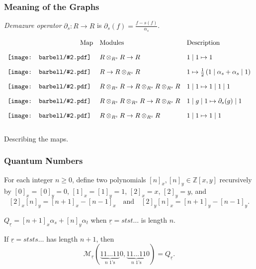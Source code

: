 \documentclass[pdf]{beamer}
\def\ul#1{\underline{#1}}
\def\MM{\mathcal M}
\def\ZZ{\mathbb Z}
\def\half{\frac{1}{2}}
\newcommand{\dobarbell}[2]{
\vcenter{\hbox{%
\texttt{[image: barbell/\#2.pdf]}
}}
}
\newcommand{\barbell}[1]{
\mathchoice%
{\dobarbell{1.6}{#1}}
{\dobarbell{1.2}{#1}}
{\dobarbell{0.9}{#1}}
{\dobarbell{0.9}{#1}}
}
\def\stimes{\otimes_{R^s}}
\begin{document}
\begin{frame}
	\frametitle{Meaning of the Graphs}
	\emph{Demazure operator} $\partial_s: R \to R$ is $\partial_s(f) = \frac{f - s(f)}{\alpha_s}$.

	\begin{table}[ht]
		\[
		\begin{array}{rll}
			\text{Map} & \text{Modules} & \text{Description} \\[1em]
			\barbell{half_top} & R \stimes R \to R & 1 \mid 1 \mapsto 1 \\[1em]
			\barbell{half_bot} & R \to R \stimes R & 1 \mapsto \half \left( 1 \mid \alpha_s + \alpha_s \mid 1 \right) \\[1em]
			\barbell{tri_down} & R \stimes R \to R \stimes R \stimes R & 1 \mid 1 \mapsto 1 \mid 1 \mid 1 \\[1em]
			\barbell{tri_up} & R \stimes R \stimes R \to R \stimes R & 1 \mid g \mid 1 \mapsto \partial_s(g) \mid 1 \\[1em]
			\barbell{id} & R \stimes R \to R \stimes R & 1 \mid 1 \mapsto 1 \mid 1 \\[1em]
		\end{array}
		\]
		\caption{Describing the maps.}
	\end{table}
\end{frame}

\begin{frame}
	\frametitle{Quantum Numbers}
	\begin{definition}
		For each integer $n \ge 0$, define two polynomials $[n]_x, [n]_y \in \ZZ[x,y]$ recursively by $[0]_x = [0]_y = 0$, $[1]_x = [1]_y = 1$, $[2]_x = x$, $[2]_y = y$, and
	\[ [2]_x[n]_y = [n+1]_x - [n-1]_x \quad\text{and}\quad [2]_y[n]_x = [n+1]_y - [n-1]_y. \]
	\end{definition}

	\pause 

	\begin{definition}
		$Q_{\ul r} = [n+1]_x \alpha_s + [n]_y \alpha_t$ when $\ul r = stst\dots$ is length $n$.
	\end{definition}

	If $\ul r = ststs\dots$ has length $n+1$, then \[ \MM_{\ul r} ( \underbrace{11\dots11}_{\text{$n$ 1's}}0, \underbrace{11\dots11}_{\text{$n$ 1's}}0 ) = Q_{\ul r}. \]
\end{frame}
\end{document}
